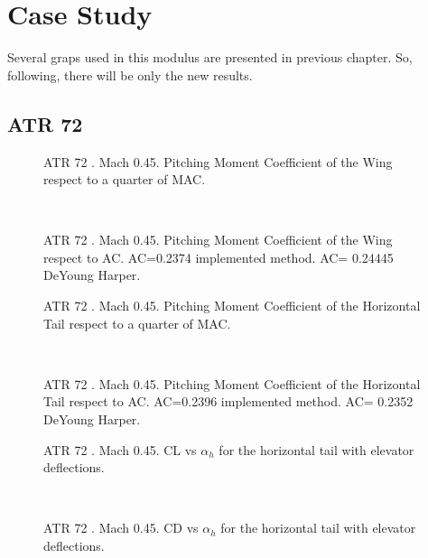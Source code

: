  
\section{Case Study}
Several graps used in this modulus are presented in previous chapter. So, following, there will be only the new results.

\subsection{ATR 72}

\begin{figure}[H]
\centering

\caption{ATR 72 . Mach 0.45. Pitching Moment Coefficient of the Wing respect to a quarter of MAC.}
\label{fig:stallATR}
\end{figure}
\noindent\\
\begin{figure}[H]
\centering

\caption{ATR 72 . Mach 0.45. Pitching Moment Coefficient of the Wing respect to AC. AC=0.2374 implemented method. AC= 0.24445 DeYoung Harper.}
\label{fig:stallATR}
\end{figure}
\begin{figure}[H]
\centering

\caption{ATR 72 . Mach 0.45. Pitching Moment Coefficient of the Horizontal Tail  respect to a quarter of MAC.}
\label{fig:stallATR}
\end{figure}
\noindent\\
\begin{figure}[H]
\centering

\caption{ATR 72 . Mach 0.45. Pitching Moment Coefficient of the Horizontal Tail respect to AC. AC=0.2396 implemented method. AC= 0.2352 DeYoung Harper.}
\label{fig:stallATR}
\end{figure}
\begin{figure}[H]
\centering

\caption{ATR 72 . Mach 0.45. CL vs $\alpha_h$ for the horizontal tail with elevator deflections.}
\label{fig:stallATR}
\end{figure}
\noindent\\
\begin{figure}[H]
\centering

\caption{ATR 72 . Mach 0.45. CD vs $\alpha_h$ for the horizontal tail with elevator deflections.}
\label{fig:stallATR}
\end{figure}

